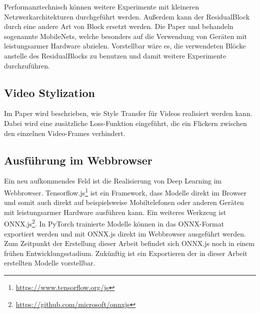 Performanztechnisch können weitere Experimente mit kleineren Netzwerkarchitekturen durchgeführt werden. Außerdem kann der ResidualBlock durch eine andere Art von Block ersetzt werden. Die Paper \cite{DBLP:journals/corr/HowardZCKWWAA17} und \cite{DBLP:journals/corr/abs-1801-04381} behandeln sogenannte MobileNets, welche besonders auf die Verwendung von Geräten mit leistungsarmer Hardware abzielen. Vorstellbar wäre es, die verwendeten Blöcke anstelle des ResidualBlocks zu benutzen und damit weitere Experimente durchzuführen.

\subsection{Video Stylization}
\label{sec:video_stylization}

Im Paper \cite{DBLP:journals/corr/abs-1807-01197} wird beschrieben, wie Style Transfer für Videos realisiert werden kann. Dabei wird eine zusätzliche Loss-Funktion eingeführt, die ein Flickern zwischen den einzelnen Video-Frames verhindert.

\subsection{Ausführung im Webbrowser}
\label{sec:inference_in_browser}

Ein neu aufkommendes Feld ist die Realisierung von Deep Learning im Webbrowser. Tensorflow.js\footnote{\url{https://www.tensorflow.org/js}} ist ein Framework, dass Modelle direkt im Browser und somit auch direkt auf beispielsweise Mobiltelefonen oder anderen Geräten mit leistungsarmer Hardware ausführen kann. Ein weiteres Werkzeug ist ONNX.js\footnote{\url{https://github.com/microsoft/onnxjs}}. In PyTorch trainierte Modelle können in das ONNX-Format exportiert werden und mit ONNX.js direkt im Webbrowser ausgeführt werden. Zum Zeitpunkt der Erstellung dieser Arbeit befindet sich ONNX.js noch in einem frühen Entwicklungsstadium. Zukünftig ist ein Exportieren der in dieser Arbeit erstellten Modelle vorstellbar.